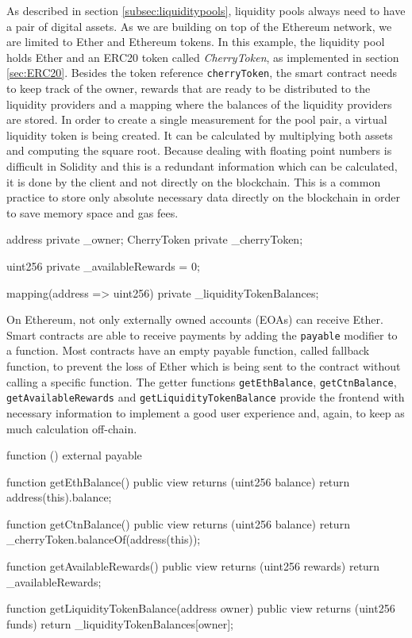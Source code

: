 As described in section \ref{subsec:liquiditypools}, liquidity pools always need to have a pair of digital assets.
As we are building on top of the Ethereum network, we are limited to Ether and Ethereum tokens. In this example, the liquidity pool holds Ether
and an ERC20 token called \textit{CherryToken}, as implemented in section \ref{sec:ERC20}. Besides the token reference \texttt{cherryToken}, the smart contract
needs to keep track of the owner, rewards that are ready to be distributed to the liquidity providers and a mapping where the balances of the liquidity providers
are stored. In order to create a single measurement for the pool pair, a virtual liquidity token is being created. It can be calculated by multiplying both assets
and computing the square root. Because dealing with floating point numbers is difficult in Solidity and this is a redundant information which can be calculated, it
is done by the client and not directly on the blockchain. This is a common practice to store only absolute necessary data directly on the blockchain in order to save
memory space and gas fees.
\begin{GenericCode}
address private _owner;
CherryToken private _cherryToken;

uint256 private _availableRewards = 0;

mapping(address => uint256) private _liquidityTokenBalances;
\end{GenericCode}

On Ethereum, not only externally owned accounts (EOAs) can receive Ether. Smart contracts are able to receive payments by adding the \texttt{payable} modifier
to a function. Most contracts have an empty payable function, called fallback function, to prevent the loss of Ether which is being sent to the contract
without calling a specific function. The getter functions \texttt{getEthBalance}, \texttt{getCtnBalance}, \texttt{getAvailableRewards} and
\texttt{getLiquidityTokenBalance} provide the frontend with necessary information to implement a good user experience and, again, to keep as much
calculation off-chain.
\begin{GenericCode}
function () external payable {}

function getEthBalance() public view returns (uint256 balance) {
  return address(this).balance;
}

function getCtnBalance() public view returns (uint256 balance) {
  return _cherryToken.balanceOf(address(this));
}

function getAvailableRewards() public view returns (uint256 rewards) {
  return _availableRewards;
}

function getLiquidityTokenBalance(address owner) public view returns (uint256 funds) {
  return _liquidityTokenBalances[owner];
}
\end{GenericCode}

